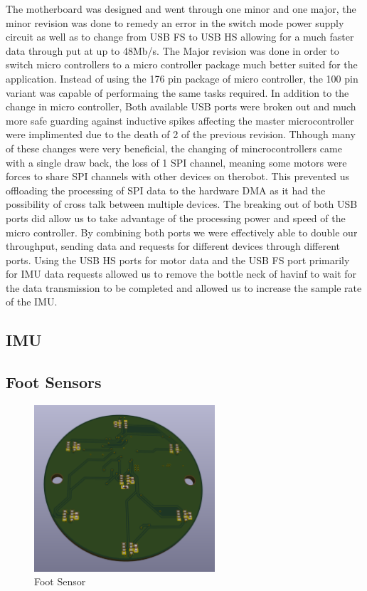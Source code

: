    The motherboard was designed and went through one minor and one major, the minor revision was done to remedy an error in the switch mode power supply circuit as well as to change from USB FS to USB HS allowing for a much faster data  through put at up to 48Mb/s.
 	The Major revision was done in order to switch micro controllers to a micro controller package much better suited for the application. Instead of using the 176 pin package of micro controller, the 100 pin variant was capable of performaing the same tasks required. In addition to the change in micro controller, Both available USB ports were broken out and much more safe guarding against inductive spikes affecting the master microcontroller were implimented due to the death of 2 of the previous revision. Thhough many of these changes were very beneficial, the changing of mincrocontrollers came with a single draw back, the loss of 1 SPI channel, meaning some motors were forces to share SPI channels with other devices on therobot. This prevented us offloading the processing of SPI data to the hardware DMA as it had the possibility of cross talk between multiple devices. The breaking out of both USB ports did allow us to take advantage of the processing power and speed of the micro controller. By combining both ports we were effectively able to double our throughput, sending data and requests for different devices through different ports. Using the USB HS ports for motor data and the USB FS port primarily for IMU data requests allowed us to remove the bottle neck of havinf to wait for the data transmission to be completed and allowed us to increase the sample rate of the IMU.
\subsection{IMU}

\subsection{Foot Sensors}
\begin{figure}[H]
       \centering
       \includegraphics[width=0.6\textwidth]{figures/FootSensor.png}
       \caption{Foot Sensor}
       \label{fig:FootSensorPCB}
   \end{figure}
